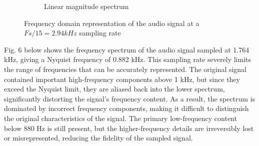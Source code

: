 \documentclass[12pt]{article}
\newcommand{\code}[1]{\colorbox{gray!20}{\texttt{#1}}}
\begin{document}
\begin{figure}[htbp]
\begin{subfigure}[b]{0.48\textwidth}
    \caption{Linear magnitude spectrum}
    \label{fig:f2}
  \end{subfigure}
  \caption{Frequency domain representation of the audio signal at a \code{$Fs/15 = 2.94kHz$} sampling rate}
\end{figure}
\FloatBarrier
Fig. 6 below shows the frequency spectrum of the audio signal sampled at 1.764 kHz, giving a Nyquist frequency of 0.882 kHz. This sampling rate severely limits the range of frequencies that can be accurately represented. The original signal contained important high-frequency components above 1 kHz, but since they exceed the Nyquist limit, they are aliased back into the lower spectrum, significantly distorting the signal’s frequency content. As a result, the spectrum is dominated by incorrect frequency components, making it difficult to distinguish the original characteristics of the signal. The primary low-frequency content below 880 Hz is still present, but the higher-frequency details are irreversibly lost or misrepresented, reducing the fidelity of the sampled signal.
\end{document}

